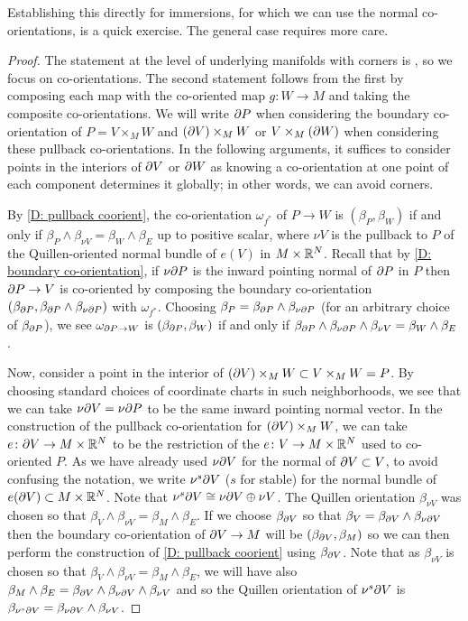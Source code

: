 Establishing this directly for immersions, for which we can use the normal co-orientations, is a quick exercise.
The general case requires more care.

\begin{proof}
	The statement at the level of underlying manifolds with corners is \cite[Proposition 6.7]{Joy12}, so we focus on co-orientations.
	The second statement follows from the first by composing each map with the co-oriented map $g \colon W \to M$ and taking the composite co-orientations.
	We will write $\partial P$ when considering the boundary co-orientation of $P = V \times_M W$ and $(\partial V) \times_M W$ or $V \times_M (\partial W)$ when considering these pullback co-orientations.
	In the following arguments, it suffices to consider points in the interiors of $\partial V$ or $\partial W$ as knowing a co-orientation at one point of each component determines it globally; in other words, we can avoid corners.

	By \cref{D: pullback coorient}, the co-orientation $\omega_{f^*}$ of $P \to W$ is $(\beta_P,\beta_W)$ if and only if $\beta_P \wedge \beta_{\nu V} = \beta_W \wedge \beta_E$ up to positive scalar, where $\nu V$ is the pullback to $P$ of the Quillen-oriented normal bundle of $e(V)$ in $M \times \mathbb{R}^N$.
	Recall that by \cref{D: boundary co-orientation}, if $\nu \partial P$ is the inward pointing normal of $\partial P$ in $P$ then $\partial P \to V$ is co-oriented by composing the boundary co-orientation $(\beta_{\partial P},\beta_{\partial P} \wedge \beta_{\nu \partial P})$ with $\omega_{f^*}$.
	Choosing $\beta_P = \beta_{\partial P} \wedge \beta_{\nu \partial P}$ (for an arbitrary choice of $\beta_{\partial P}$), we see $\omega_{\partial P \to W}$ is $(\beta_{\partial P},\beta_W)$ if and only if $\beta_{\partial P} \wedge \beta_{\nu\partial P} \wedge \beta_{\nu V} = \beta_W \wedge \beta_E$.

	Now, consider a point in the interior of $(\partial V) \times_M W \subset V \times_M W = P$.
	By choosing standard choices of coordinate charts in such neighborhoods, we see that we can take $\nu\partial V = \nu \partial P$ to be the same inward pointing normal vector.
	In the construction of the pullback co-orientation for $(\partial V) \times_M W$, we can take $e \colon \partial V \to M \times \mathbb{R}^N$ to be the restriction of the $e \colon V \to M \times \mathbb{R}^N$ used to co-oriented $P$.
	As we have already used $\nu \partial V$ for the normal of $\partial V \subset V$, to avoid confusing the notation, we write $\nu^s\partial V$ ($s$ for stable) for the normal bundle of $e(\partial V) \subset M \times \mathbb{R}^N$.
	Note that $\nu^s\partial V \cong \nu\partial V \oplus \nu V$.
	The Quillen orientation $\beta_{\nu V}$ was chosen so that $\beta_V \wedge \beta_{\nu V} = \beta_{M} \wedge \beta_E$.
	If we choose $\beta_{\partial V}$ so that $\beta_V = \beta_{\partial V} \wedge \beta_{\nu\partial V}$ then the boundary co-orientation of $\partial V \to M$ will be $(\beta_{\partial V},\beta_M)$ so we can then perform the construction of \cref{D: pullback coorient} using $\beta_{\partial V}$.
	Note that as $\beta_{\nu V}$ is chosen so that $\beta_V \wedge \beta_{\nu V} = \beta_M \wedge \beta_E$, we will have also $\beta_M \wedge \beta_E = \beta_{\partial V} \wedge \beta_{\nu\partial V} \wedge \beta_{\nu V}$ and so the Quillen orientation of $\nu^s\partial V$ is $\beta_{\nu^s\partial V} = \beta_{\nu\partial V} \wedge \beta_{\nu V}$.


\end{proof}
